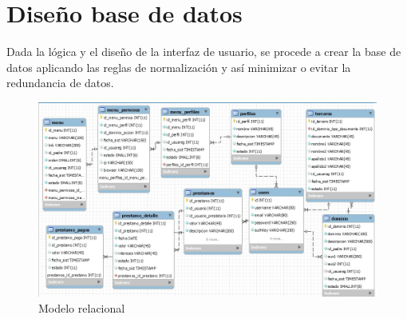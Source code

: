 \section{Diseño base de datos}

{Dada la lógica y el diseño de la interfaz de usuario, se procede a crear la base de datos aplicando las reglas de normalización y así minimizar o evitar la redundancia de datos.

\begin{figure}[H]
	\centering
	\includegraphics[width=1\linewidth]{development/modelo.png}
	\caption{Modelo relacional}
\end{figure}
}